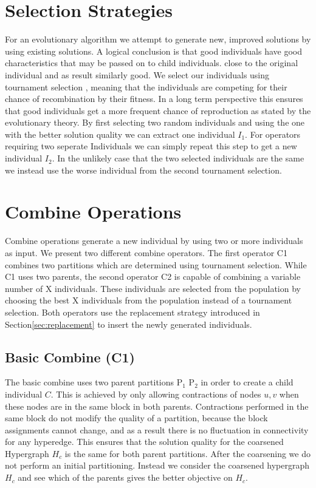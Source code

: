 \documentclass[a4paper,12pt,titlepage, BCOR7mm,headsepline]{scrbook}
\numberwithin{equation}{section}
\begin{document}
\section{Selection Strategies}
\label{sec:selectionstrategies}
For an evolutionary algorithm we attempt to generate new, improved solutions by using existing solutions. A logical conclusion is that good individuals have good characteristics that may be passed on to child individuals.
close to the original individual and as result similarly good. We select our individuals using tournament selection \cite{blickle1996comparison}, meaning that the individuals are competing for their chance of recombination by their fitness. In a long term perspective this ensures that good individuals get a more frequent chance of reproduction as stated by the evolutionary theory.  By first selecting two random individuals and using the one with the better solution quality we can extract one individual $I_1$. For operators requiring two seperate Individuals we can simply repeat this step to get a new individual $I_2$. In the unlikely case that the two selected individuals are the same we instead use the worse individual from the second tournament selection.
\section{Combine Operations}
\label{sec:combines}
Combine operations generate a new individual by using two or more individuals as input. We present two different combine operators. The first operator C1 combines two partitions which are determined using tournament selection. While C1 uses two parents, the second operator C2 is capable of combining a variable number of X individuals. These individuals are selected from the population by choosing the best X individuals from the population instead of a tournament selection. Both operators use the replacement strategy introduced in Section\ref{sec:replacement} to insert the newly generated individuals.
\subsection{Basic Combine (C1)}
\label{sec:basiccombine}
The basic combine uses two parent partitions P$_1$ P$_2$ in order to create a child individual $C$. This is achieved by only allowing contractions of nodes $u, v$ when these nodes are in the same block in both parents. Contractions performed in the same block do not modify the quality of a partition, because the block assignments cannot change, and as a result there is no fluctuation in connectivity for any hyperedge.
This ensures that the solution quality for the coarsened Hypergraph $H_c$ is the same for both parent partitions.  
After the coarsening we do not perform an initial partitioning. Instead we consider the coarsened hypergraph $H_c$ and see which of the parents gives the better objective on $H_c$.
\end{document}
